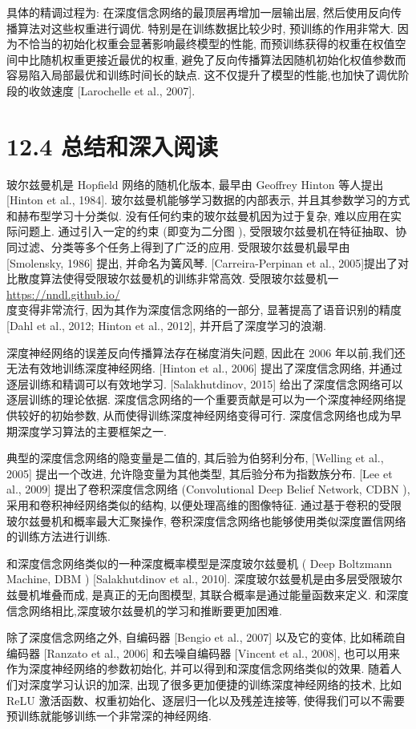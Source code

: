 \documentclass[10pt]{article}
\begin{document}
具体的精调过程为: 在深度信念网络的最顶层再增加一层输出层, 然后使用反向传播算法对这些权重进行调优. 特别是在训练数据比较少时, 预训练的作用非常大. 因为不恰当的初始化权重会显著影响最终模型的性能, 而预训练获得的权重在权值空间中比随机权重更接近最优的权重, 避免了反向传播算法因随机初始化权值参数而容易陷入局部最优和训练时间长的缺点. 这不仅提升了模型的性能,也加快了调优阶段的收敛速度 [Larochelle et al., 2007].

\section*{12.4 总结和深入阅读}
玻尔兹曼机是 Hopfield 网络的随机化版本, 最早由 Geoffrey Hinton 等人提出 [Hinton et al., 1984]. 玻尔兹曼机能够学习数据的内部表示, 并且其参数学习的方式和赫布型学习十分类似. 没有任何约束的玻尔兹曼机因为过于复杂, 难以应用在实际问题上. 通过引入一定的约束 (即变为二分图 ), 受限玻尔兹曼机在特征抽取、协同过滤、分类等多个任务上得到了广泛的应用. 受限玻尔兹曼机最早由 [Smolensky, 1986] 提出, 并命名为簧风琴. [Carreira-Perpinan et al., 2005]提出了对比散度算法使得受限玻尔兹曼机的训练非常高效. 受限玻尔兹曼机一 \href{https://nndl.github.io/}{https://nndl.github.io/}\\
度变得非常流行, 因为其作为深度信念网络的一部分, 显著提高了语音识别的精度 [Dahl et al., 2012; Hinton et al., 2012], 并开启了深度学习的浪潮.

深度神经网络的误差反向传播算法存在梯度消失问题, 因此在 2006 年以前,我们还无法有效地训练深度神经网络. [Hinton et al., 2006] 提出了深度信念网络, 并通过逐层训练和精调可以有效地学习. [Salakhutdinov, 2015] 给出了深度信念网络可以逐层训练的理论依据. 深度信念网络的一个重要贡献是可以为一个深度神经网络提供较好的初始参数, 从而使得训练深度神经网络变得可行. 深度信念网络也成为早期深度学习算法的主要框架之一.

典型的深度信念网络的隐变量是二值的, 其后验为伯努利分布, [Welling et al., 2005] 提出一个改进, 允许隐变量为其他类型, 其后验分布为指数族分布. [Lee et al., 2009] 提出了卷积深度信念网络 (Convolutional Deep Belief Network, CDBN ), 采用和卷积神经网络类似的结构, 以便处理高维的图像特征. 通过基于卷积的受限玻尔兹曼机和概率最大汇聚操作, 卷积深度信念网络也能够使用类似深度置信网络的训练方法进行训练.

和深度信念网络类似的一种深度概率模型是深度玻尔兹曼机 ( Deep Boltzmann Machine, DBM ) [Salakhutdinov et al., 2010]. 深度玻尔兹曼机是由多层受限玻尔兹曼机堆叠而成, 是真正的无向图模型, 其联合概率是通过能量函数来定义. 和深度信念网络相比,深度玻尔兹曼机的学习和推断要更加困难.

除了深度信念网络之外, 自编码器 [Bengio et al., 2007] 以及它的变体, 比如稀疏自编码器 [Ranzato et al., 2006] 和去噪自编码器 [Vincent et al., 2008], 也可以用来作为深度神经网络的参数初始化, 并可以得到和深度信念网络类似的效果. 随着人们对深度学习认识的加深, 出现了很多更加便捷的训练深度神经网络的技术, 比如 ReLU 激活函数、权重初始化、逐层归一化以及残差连接等, 使得我们可以不需要预训练就能够训练一个非常深的神经网络.
\end{document}
